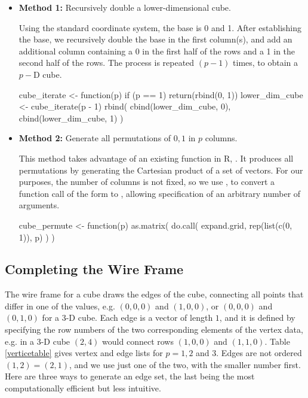 \begin{itemize}

  \item {\bf Method 1:} Recursively double a lower-dimensional cube.

    Using the standard coordinate system, the base is 0 and 1. After
    establishing the base, we recursively double the base in the first
    column(s), and add an additional column containing a 0 in the
    first half of the rows and a 1 in the second half of the rows. The
    process is repeated $(p-1)$ times, to obtain a $p-$D cube.

\begin{example}
cube_iterate <- function(p) {
  if (p == 1) {
    return(rbind(0, 1))
  }
  lower_dim_cube <- cube_iterate(p - 1)
  rbind(
    cbind(lower_dim_cube, 0),
    cbind(lower_dim_cube, 1)
  )
}
\end{example}

  \item {\bf Method 2:} Generate all permutations of ${0, 1}$ in $p$ columns.

    This method takes advantage of an existing function in R,
    . It produces all permutations by generating the
    Cartesian product of a set of vectors. For our purposes, the
    number of columns is not fixed, so we use , to
    convert a function call of the form  to
    , allowing specification of an
    arbitrary number of arguments.

  \begin{example}
cube_permute <- function(p) {
  as.matrix(
    do.call(
      expand.grid,
      rep(list(c(0, 1)), p)
    )
  )
}
\end{example}
\end{itemize}

\subsection{Completing the Wire Frame}

The wire frame for a cube draws the edges of the cube,
connecting all points that differ in one of the values, e.g. $(0,0,0)$
and $(1,0,0)$, or $(0,0,0)$ and $(0,1,0)$ for a 3-D cube. Each edge is
a vector of length $1$, and it is defined by specifying the row
numbers of the two corresponding elements of the vertex data, e.g. in
a 3-D cube $(2,4)$ would connect rows $ (1,0,0)$ and $
(1,1,0)$. Table \ref{verticetable} gives vertex
and edge lists for $p=1, 2$ and $3$. Edges are not ordered $(1,2)=(2,1)$, and we use just
one of the two, with the smaller number first. Here are three ways to
generate an edge set, the last being the most computationally
efficient but less intuitive.


